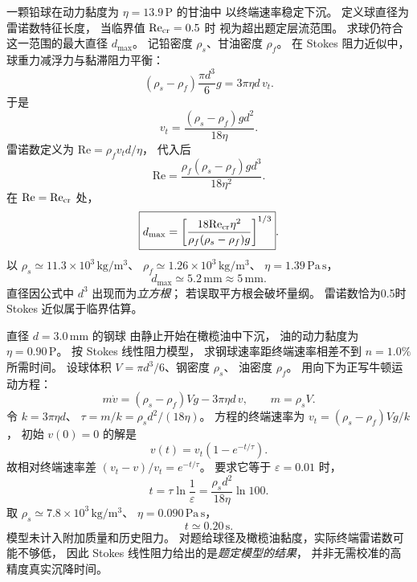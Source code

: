 一颗铅球在动力黏度为
$\eta=13.9\,\mathrm P$ 的甘油中
以终端速率稳定下沉。
定义球直径为雷诺数特征长度，
当临界值 $\mathrm{Re}_{\rm cr}=0.5$ 时
视为超出题定层流范围。
求球仍符合这一范围的最大直径 $d_{\max}$。
\exsolution
记铅密度 $\rho_s$、甘油密度 $\rho_f$。
在 Stokes 阻力近似中，
球重力减浮力与黏滞阻力平衡：
\[
(\rho_s-\rho_f)\frac{\pi d^3}{6}g
=3\pi\eta d\,v_t.
\]
于是
\[
v_t=\frac{(\rho_s-\rho_f)gd^2}{18\eta}.
\]
雷诺数定义为
$\mathrm{Re}=\rho_fv_td/\eta$，
代入后
\[
\mathrm{Re}=
\frac{\rho_f(\rho_s-\rho_f)gd^3}{18\eta^2}.
\]
在 $\mathrm{Re}=\mathrm{Re}_{\rm cr}$ 处，
\[
\boxed{d_{\max}=
\left[\frac{18\mathrm{Re}_{\rm cr}\eta^2}
{\rho_f(\rho_s-\rho_f)g}\right]^{1/3}}.
\]
以 $\rho_s\simeq11.3\times10^3\,\mathrm{kg/m^3}$、
$\rho_f\simeq1.26\times10^3\,\mathrm{kg/m^3}$、
$\eta=1.39\,\mathrm{Pa\,s}$，
\[
\boxed{d_{\max}\simeq5.2\,\mathrm{mm}\approx5\,\mathrm{mm}}.
\]
\excheck 直径因公式中 $d^3$ 出现而为\emph{立方根}；
若误取平方根会破坏量纲。
雷诺数恰为0.5时 Stokes 近似属于临界估算。

直径 $d=3.0\,\mathrm{mm}$ 的钢球
由静止开始在橄榄油中下沉，
油的动力黏度为 $\eta=0.90\,\mathrm P$。
按 Stokes 线性阻力模型，
求钢球速率距终端速率相差不到
$n=1.0\%$ 所需时间。
\exsolution
设球体积 $V=\pi d^3/6$、钢密度 $\rho_s$、
油密度 $\rho_f$。
用向下为正写牛顿运动方程：
\[
m\dot v=(\rho_s-\rho_f)Vg-3\pi\eta d\,v,
\qquad m=\rho_sV.
\]
令
$k=3\pi\eta d$、
$\tau=m/k=\rho_s d^2/(18\eta)$。
方程的终端速率为
$v_t=(\rho_s-\rho_f)Vg/k$，
初始 $v(0)=0$ 的解是
\[
v(t)=v_t(1-e^{-t/\tau}).
\]
故相对终端速率差
$(v_t-v)/v_t=e^{-t/\tau}$。
要求它等于 $\varepsilon=0.01$ 时，
\[
\boxed{t=\tau\ln\frac1\varepsilon
=\frac{\rho_s d^2}{18\eta}\ln100}.
\]
取 $\rho_s\simeq7.8\times10^3\,\mathrm{kg/m^3}$、
$\eta=0.090\,\mathrm{Pa\,s}$，
\[
\boxed{t\simeq0.20\,\mathrm s}.
\]
\excheck 模型未计入附加质量和历史阻力。
对题给球径及橄榄油黏度，实际终端雷诺数可能不够低，
因此 Stokes 线性阻力给出的是\emph{题定模型的结果}，
并非无需校准的高精度真实沉降时间。

